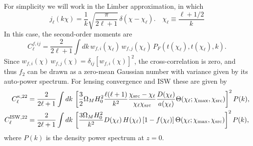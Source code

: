\documentclass[a4paper,10pt]{article}
\begin{document}
  For simplicity we will work in the Limber approximation, in which
  \begin{equation}
    j_\ell(k\chi)=\frac{1}{k}\sqrt{\frac{\pi}{2\ell+1}}\,\delta\left(\chi-\chi_\ell\right).
    \hspace{12pt}\chi_\ell\equiv\frac{\ell+1/2}{k}
  \end{equation}
  In this case, the second-order moments are
  \begin{equation}
   C^{f,ij}_\ell=\frac{2}{2\ell+1}\int dk\,w_{f,i}(\chi_\ell)\,w_{f,j}(\chi_\ell)\,P_F(t(\chi_\ell),t(\chi_\ell),k).
  \end{equation}
  Since $w_{f,i}(\chi)\,w_{f,j}(\chi)=\delta_{ij}\left[w_{f,i}(\chi)\right]^2$, the cross-correlation is zero, and thus $f_2$ can be drawn as a zero-mean Gaussian number with variance given by its auto-power spectrum. For lensing convergence and ISW these are given by
  \begin{align}
    C^{\kappa,22}_\ell&=\frac{2}{2\ell+1}\int dk\,\left[\frac{3}{2}\Omega_MH_0^2\frac{\ell(\ell+1)}{k^2}\frac{\chi_{\rm src}-\chi_\ell}{\chi_\ell\chi_{\rm src}}\frac{D(\chi_\ell)}{a(\chi_\ell)}\Theta(\chi_\ell;\chi_{\rm max},\chi_{\rm src})\right]^2P(k),\\
    C^{{\rm ISW},22}_\ell&=\frac{2}{2\ell+1}\int dk\,\left[\frac{3\Omega_MH_0^2}{k^2}D(\chi_\ell)\,H(\chi_\ell)\,[1-f(\chi_\ell)]\,\Theta(\chi_\ell;\chi_{\rm max},\chi_{\rm src})\right]^2P(k),
  \end{align}
  where $P(k)$ is the density power spectrum at $z=0$.

  
\end{document}
